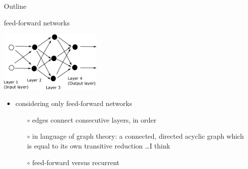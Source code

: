 \documentclass[xcolor={svgnames},
               hyperref={colorlinks,citecolor=DeepPink4,linkcolor=FireBrick,urlcolor=Maroon}]
               {beamer}
\begin{document}
\begin{frame}{Outline}
\end{frame}


\begin{frame}{feed-forward networks}

\begin{center}
\includegraphics[height=30mm]{figs/network}
\end{center}

\begin{itemize}
\item considering only \alert{feed-forward} networks
    \begin{itemize}
    \item[$\circ$] edges connect consecutive layers, in order
    \item[$\circ$] in language of graph theory: a connected, directed acyclic graph which is equal to its own transitive reduction \dots I think
    \item[$\circ$] \alert{feed-forward} versus \alert{recurrent}
    \end{itemize}
\end{itemize}
\end{frame}
\end{document}
